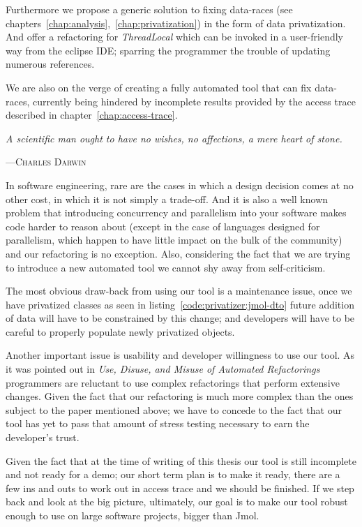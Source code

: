 Furthermore we propose a generic solution to fixing data-races (see
chapters~\ref{chap:analysis},~\ref{chap:privatization}) in the form of data
privatization. And offer a refactoring for \emph{ThreadLocal} which can be
invoked in a user-friendly way from the eclipse IDE; sparring the programmer the
trouble of updating numerous references.

We are also on the verge of creating a fully automated tool that can fix
data-races, currently being hindered by incomplete results provided by the
access trace described in chapter~\ref{chap:access-trace}.

\epigraph{\textit{A scientific man ought to have no wishes, no affections, a
mere heart of stone.}}{---\textsc{Charles Darwin}}

In software engineering, rare are the cases in which a design decision comes at
no other cost, in which it is not simply a trade-off. And it is also a well
known problem that introducing concurrency and parallelism into your software
makes code harder to reason about (except in the case of languages designed for
parallelism, which happen to have little impact on the bulk of the community)
and our refactoring is no exception. Also, considering the fact that we are
trying to introduce a new automated tool we cannot shy away from self-criticism.

The most obvious draw-back from using our tool is a maintenance issue, once
we have privatized classes as seen in listing~\ref{code:privatizer:jmol-dto}
future addition of data will have to be constrained by this change; and
developers will have to be careful to properly populate newly privatized
objects.

Another important issue is usability and developer willingness to use our tool.
As it was pointed out in \emph{Use, Disuse, and Misuse of Automated
Refactorings}~\cite{Ref-UseDisuse} programmers are reluctant to use complex
refactorings that perform extensive changes. Given the fact that our refactoring
is much more complex than the ones subject to the paper mentioned above; we have
to concede to the fact that our tool has yet to pass that amount of stress
testing necessary to earn the developer's trust.

Given the fact that at the time of writing of this thesis our tool is still
incomplete and not ready for a demo; our short term plan is to make it ready,
there are a few ins and outs to work out in access trace and we should be
finished. If we step back and look at the big picture, ultimately, our goal is
to make our tool robust enough to use on large software projects, bigger than
Jmol.

